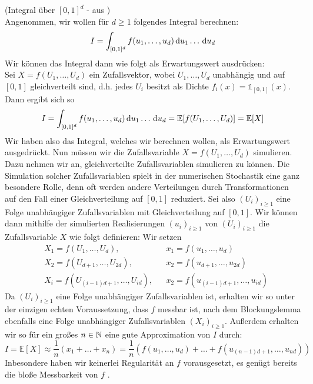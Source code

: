 \begin{Beispiel}(Integral über $ [0,1]^d $ - aus \cite{lapeyre2003introduction})\\
	\label{BeispielIntegral}
	Angenommen, wir wollen für $ d \geq 1 $ folgendes Integral berechnen:
	\[
		I = \int_{[0,1]^d} f(u_1,\dots,u_d) \, \mathrm{d} u_1\dots\, \mathrm{d} u_d
	\]
	Wir können das Integral dann wie folgt als Erwartungswert ausdrücken: \\
	Sei $ X = f(U_1,\dots,U_d) $ ein 
	Zufallsvektor, wobei $ U_1,\dots,U_d $ unabhängig und auf $ [0,1] $ gleichverteilt sind, d.h. jedes $ U_i $ besitzt als Dichte $ f_i(x) = \mathds{1}_{[0,1]}(x) $.
	Dann ergibt sich so 
	\[
		I = \int_{[0,1]^d} f(u_1,\dots,u_d) \, \mathrm{d} u_1\dots\, \mathrm{d} u_d = \mathbb{E}[f(U_1,\dots,U_d)] = \mathbb{E}[X]
	\]
	Wir haben also das Integral, welches wir berechnen wollen, als Erwartungswert ausgedrückt. Nun müssen wir die Zufallsvariable $ X = f(U_1,\dots,U_d) $ simulieren.
	Dazu nehmen wir an, gleichverteilte Zufallsvariablen simulieren zu können. Die Simulation solcher Zufallsvariablen spielt in der numerischen Stochastik eine ganz besondere Rolle, denn oft werden andere Verteilungen durch Transformationen auf den Fall einer Gleichverteilung auf $ [0,1] $ reduziert.
	Sei also $ (U_i)_{i \geq 1} $ eine Folge unabhängiger Zufallsvariablen mit Gleichverteilung auf $ [0,1] $. Wir können dann mithilfe der simulierten Realisierungen $ (u_i)_{i \geq 1} $  von $ (U_i)_{i \geq 1} $ die Zufallsvariable $ X $ wie folgt definieren: Wir setzen
	\begin{align*}
		&X_1 = f(U_1,\dots,U_d), & &x_1 = f(u_1,\dots,u_d) \\
		&X_2 = f(U_{d+1},\dots,U_{2d}), & &x_2 = f(u_{d+1},\dots,u_{2d}) \\
		&X_i = f(U_{(i-1)d+1},\dots,U_{id}), & &x_2 = f(u_{(i-1)d+1},\dots,u_{id})
	\end{align*}
	Da $ (U_i)_{i \geq 1} $ eine Folge unabhängiger Zufallsvariablen ist, erhalten wir so unter der einzigen echten Voraussetzung, dass $ f $ messbar ist, nach dem Blockungslemma ebenfalls eine Folge unabhängiger Zufallsvariablen $ (X_i)_{i \geq 1} $.
	Außerdem erhalten wir so für ein großes $ n \in \mathbb{N} $ eine gute Approximation von $ I $ durch:
	\[
		I = \mathbb{E}[X] \approx \frac{1}{n}(x_1+\dots+x_n) = \frac{1}{n} (f(u_1,\dots,u_d)+\dots+f(u_{(n-1)d+1},\dots,u_{nd}))
	\]	
	Inbesondere haben wir keinerlei Regularität an $ f $ vorausgesetzt, es genügt bereits die bloße Messbarkeit von $ f $ .
\end{Beispiel}



